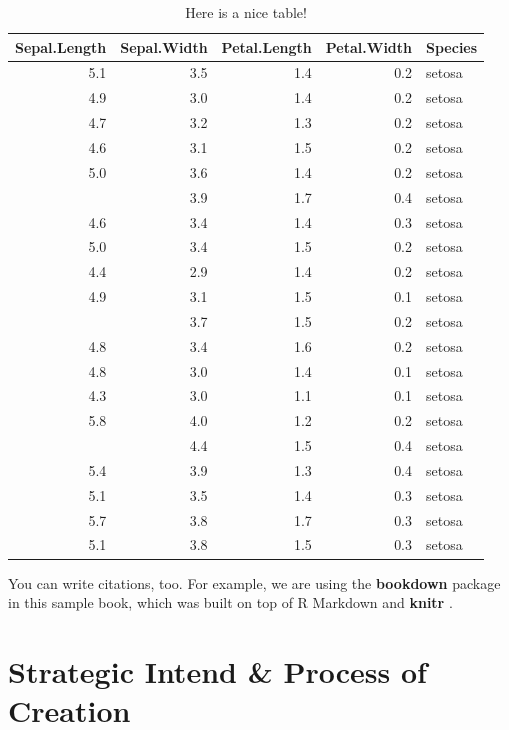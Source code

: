 \documentclass[
]{book}
\begin{document}
\begin{table}

\caption{\label{tab:nice-tab}Here is a nice table!}
\centering
\begin{tabular}[t]{rrrrl}
\toprule
Sepal.Length & Sepal.Width & Petal.Length & Petal.Width & Species\\
\midrule
5.1 & 3.5 & 1.4 & 0.2 & setosa\\
4.9 & 3.0 & 1.4 & 0.2 & setosa\\
4.7 & 3.2 & 1.3 & 0.2 & setosa\\
4.6 & 3.1 & 1.5 & 0.2 & setosa\\
5.0 & 3.6 & 1.4 & 0.2 & setosa\\
\addlinespace
5.4 & 3.9 & 1.7 & 0.4 & setosa\\
4.6 & 3.4 & 1.4 & 0.3 & setosa\\
5.0 & 3.4 & 1.5 & 0.2 & setosa\\
4.4 & 2.9 & 1.4 & 0.2 & setosa\\
4.9 & 3.1 & 1.5 & 0.1 & setosa\\
\addlinespace
5.4 & 3.7 & 1.5 & 0.2 & setosa\\
4.8 & 3.4 & 1.6 & 0.2 & setosa\\
4.8 & 3.0 & 1.4 & 0.1 & setosa\\
4.3 & 3.0 & 1.1 & 0.1 & setosa\\
5.8 & 4.0 & 1.2 & 0.2 & setosa\\
\addlinespace
5.7 & 4.4 & 1.5 & 0.4 & setosa\\
5.4 & 3.9 & 1.3 & 0.4 & setosa\\
5.1 & 3.5 & 1.4 & 0.3 & setosa\\
5.7 & 3.8 & 1.7 & 0.3 & setosa\\
5.1 & 3.8 & 1.5 & 0.3 & setosa\\
\bottomrule
\end{tabular}
\end{table}

You can write citations, too. For example, we are using the \textbf{bookdown} package \citep{R-bookdown} in this sample book, which was built on top of R Markdown and \textbf{knitr} \citep{xie2015}.

\hypertarget{strategic-intend-process-of-creation}{%
\chapter{Strategic Intend \& Process of Creation}\label{strategic-intend-process-of-creation}}
\end{document}
